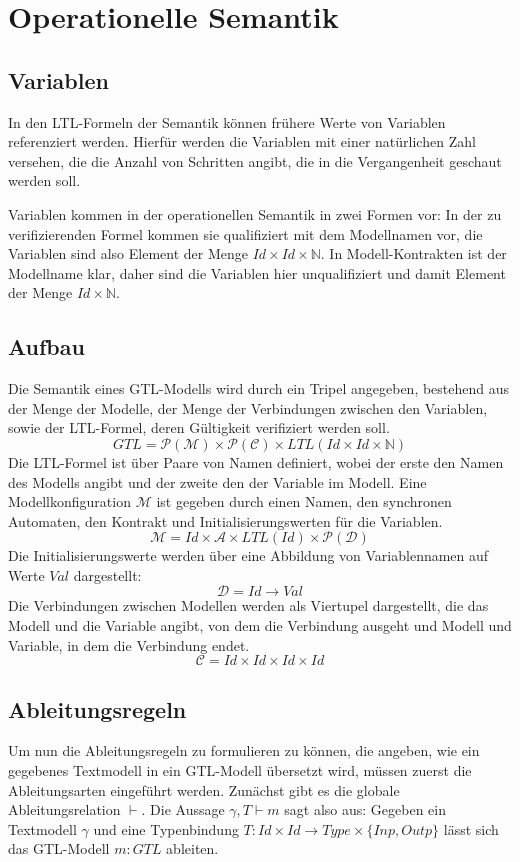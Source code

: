 \section{Operationelle Semantik}
\subsection{Variablen}
In den LTL-Formeln der Semantik können frühere Werte von Variablen referenziert werden.
Hierfür werden die Variablen mit einer natürlichen Zahl versehen, die die Anzahl von Schritten angibt, die in die Vergangenheit geschaut werden soll.

Variablen kommen in der operationellen Semantik in zwei Formen vor:
In der zu verifizierenden Formel kommen sie qualifiziert mit dem Modellnamen vor, die Variablen sind also Element der Menge $\mathit{Id}\times\mathit{Id}\times\mathbb{N}$.
In Modell-Kontrakten ist der Modellname klar, daher sind die Variablen hier unqualifiziert und damit Element der Menge $\mathit{Id}\times\mathbb{N}$.
\subsection{Aufbau}
\label{sec:sos_defs}
Die Semantik eines GTL-Modells wird durch ein Tripel angegeben, bestehend aus der Menge der Modelle, der Menge der Verbindungen zwischen den Variablen, sowie der LTL-Formel, deren Gültigkeit verifiziert werden soll.
\[ \mathit{GTL} = \mathcal{P}(\mathcal{M})\times\mathcal{P}(\mathcal{C})\times\mathit{LTL}(\mathit{Id}\times\mathit{Id}\times\mathbb{N}) \]
Die LTL-Formel ist über Paare von Namen definiert, wobei der erste den Namen des Modells angibt und der zweite den der Variable im Modell.
Eine Modellkonfiguration $\mathcal{M}$ ist gegeben durch einen Namen, den synchronen Automaten, den Kontrakt und Initialisierungswerten für die Variablen.
\[ \mathcal{M} = \mathit{Id}\times\mathcal{A}\times\mathit{LTL}(\mathit{Id})\times\mathcal{P}(\mathcal{D}) \]
Die Initialisierungswerte werden über eine Abbildung von Variablennamen auf Werte $\mathit{Val}$ dargestellt:
\[ \mathcal{D} = \mathit{Id}\rightarrow\mathit{Val} \]
Die Verbindungen zwischen Modellen werden als Viertupel dargestellt, die das Modell und die Variable angibt, von dem die Verbindung ausgeht und Modell und Variable, in dem die Verbindung endet.
\[ \mathcal{C} = \mathit{Id}\times\mathit{Id}\times\mathit{Id}\times\mathit{Id} \]
\subsection{Ableitungsregeln}
Um nun die Ableitungsregeln zu formulieren zu können, die angeben, wie ein gegebenes Textmodell in ein GTL-Modell übersetzt wird, müssen zuerst die Ableitungsarten eingeführt werden.
Zunächst gibt es die globale Ableitungsrelation $\vdash$.
Die Aussage $\gamma,T\vdash m$ sagt also aus:
Gegeben ein Textmodell $\gamma$ und eine Typenbindung $T : \mathit{Id}\times\mathit{Id}\rightarrow\mathit{Type}\times\{\mathit{Inp},\mathit{Outp}\}$ lässt sich das GTL-Modell $m : \mathit{GTL}$ ableiten.

